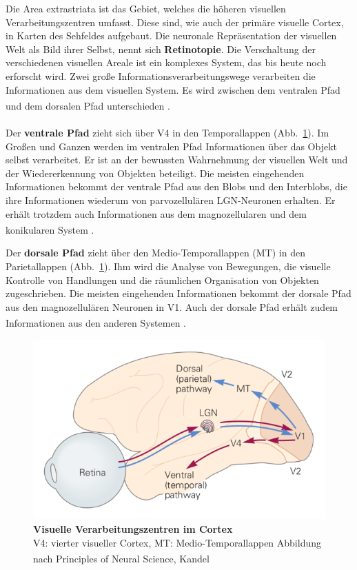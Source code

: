 \documentclass[12pt,a4paper,pdftex]{article}
\begin{document}
Die Area extrastriata ist das Gebiet, welches die höheren visuellen Verarbeitungszentren umfasst. Diese sind, wie auch der primäre visuelle Cortex, in Karten des Sehfeldes aufgebaut. Die neuronale Repräsentation der visuellen Welt als Bild ihrer Selbst, nennt sich \textbf{Retinotopie}.  Die Verschaltung der verschiedenen visuellen Areale ist ein komplexes System, das bis heute noch erforscht wird. Zwei große Informationsverarbeitungswege verarbeiten die Informationen aus dem visuellen System. Es wird zwischen dem ventralen Pfad und dem dorsalen Pfad unterschieden \textsuperscript{\cite[25]{kandel2013principles}}.
\\
\\ \noindent Der \textbf{ventrale Pfad} zieht sich über V4 in den Temporallappen (Abb.~\ref{fig:visual_pathway_cortex}). Im Großen und Ganzen werden im ventralen Pfad Informationen über das Objekt selbst verarbeitet. Er ist an der bewussten Wahrnehmung der visuellen Welt und der Wiedererkennung von Objekten beteiligt. Die meisten eingehenden Informationen bekommt der ventrale Pfad aus den Blobs und den Interblobs, die ihre Informationen wiederum von parvozellulären LGN-Neuronen erhalten. Er erhält trotzdem auch Informationen aus dem magnozellularen und dem konikularen System \textsuperscript{\cite[10]{neurowissenschaften_baer}}.


Der \textbf{dorsale Pfad} zieht über den Medio-Temporallappen (MT) in den Parietallappen (Abb.~\ref{fig:visual_pathway_cortex}). Ihm wird die Analyse von Bewegungen, die visuelle Kontrolle von Handlungen  
und die räumlichen Organisation von Objekten zugeschrieben. Die meisten eingehenden Informationen bekommt der dorsale Pfad aus den magnozellulären Neuronen in V1. Auch der dorsale Pfad erhält zudem Informationen aus den anderen Systemen \textsuperscript{\cite[10]{neurowissenschaften_baer}}.

\begin{figure}[H]
    \centering
    \includegraphics{pictures/visual/visual_Cortex.png}
    \caption[Visuelle Verarbeitungszentren im Cortex]{\textbf{Visuelle Verarbeitungszentren im Cortex}\\
    V4: vierter visueller Cortex, MT: Medio-Temporallappen
    Abbildung nach Principles of Neural Science, Kandel \textsuperscript{\cite[27]{kandel2013principles}}}
    \label{fig:visual_pathway_cortex}
\end{figure}
\end{document}
